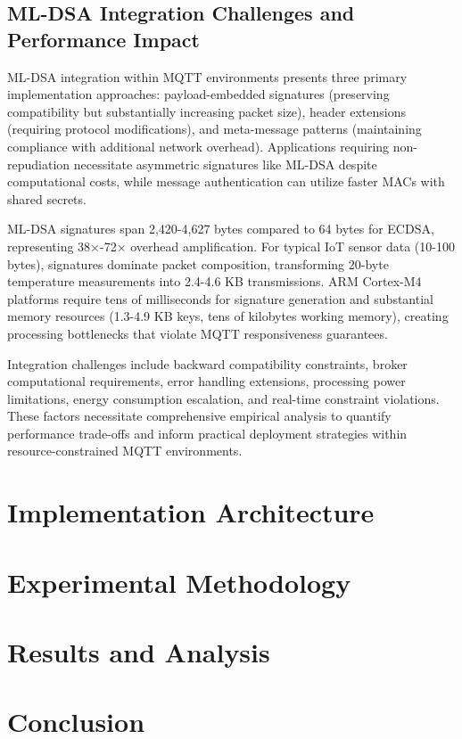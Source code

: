 \documentclass[journal=tches,final]{iacrtrans}
\begin{document}
{\color{blue}\subsection{ML-DSA Integration Challenges and Performance Impact}

ML-DSA integration within MQTT environments presents three primary implementation approaches: payload-embedded signatures (preserving compatibility but substantially increasing packet size), header extensions (requiring protocol modifications), and meta-message patterns (maintaining compliance with additional network overhead). Applications requiring non-repudiation necessitate asymmetric signatures like ML-DSA despite computational costs, while message authentication can utilize faster MACs with shared secrets.

ML-DSA signatures span 2,420-4,627 bytes compared to 64 bytes for ECDSA, representing 38×-72× overhead amplification. For typical IoT sensor data (10-100 bytes), signatures dominate packet composition, transforming 20-byte temperature measurements into 2.4-4.6 KB transmissions. ARM Cortex-M4 platforms require tens of milliseconds for signature generation and substantial memory resources (1.3-4.9 KB keys, tens of kilobytes working memory), creating processing bottlenecks that violate MQTT responsiveness guarantees.

Integration challenges include backward compatibility constraints, broker computational requirements, error handling extensions, processing power limitations, energy consumption escalation, and real-time constraint violations. These factors necessitate comprehensive empirical analysis to quantify performance trade-offs and inform practical deployment strategies within resource-constrained MQTT environments.}


\section{Implementation Architecture}\label{sec:architecture}

\section{Experimental Methodology}\label{sec:methodology}

\section{Results and Analysis}\label{sec:results}

\section{Conclusion}\label{sec:conclusion}

\newpage



\end{document}
